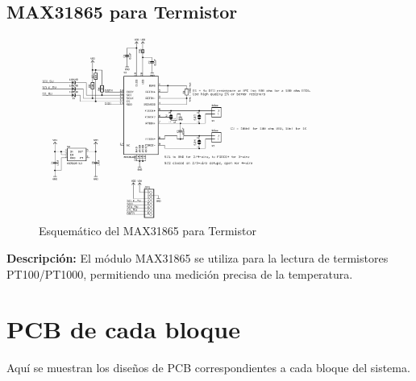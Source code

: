 \subsection{MAX31865 para Termistor}
\begin{figure}[H]
    \centering
    \includegraphics[width=0.8\textwidth]{Imagenes/MAX31865.png}
    \caption{Esquemático del MAX31865 para Termistor}
    \label{fig:max31865}
\end{figure}
\textbf{Descripción:} El módulo MAX31865 se utiliza para la lectura de termistores PT100/PT1000, permitiendo una medición precisa de la temperatura.

\newpage
\section{PCB de cada bloque}
Aquí se muestran los diseños de PCB correspondientes a cada bloque del sistema.


